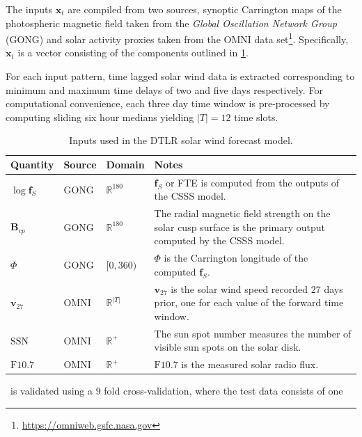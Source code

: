 The inputs $\mathbf{x}_t$ are compiled from two sources, synoptic Carrington maps of the photospheric 
magnetic field taken from the \emph{Global Oscillation Network Group} (GONG) and solar activity 
proxies taken from the OMNI data set\footnote{\url{https://omniweb.gsfc.nasa.gov}}. Specifically, 
$\mathbf{x}_t$ is a vector consisting of the components outlined in \cref{table:dtlrInputs}.

For each input pattern, time lagged solar wind data is extracted corresponding to minimum and 
maximum time delays of two and five days respectively. For computational convenience, each three 
day time window is pre-processed by computing sliding six hour medians yielding $|T| = 12$ time 
slots.
%
\begin{table}[ht]
    \centering
    \begin{tabular}{l l l p{}}
        \hline
        \textbf{Quantity} & \textbf{Source} & \textbf{Domain} & \textbf{Notes}\\
        \hline
        \vspace{5pt}
          $\log \mathbf{f}_S$ & 
          GONG & 
          $\mathbb{R}^{180}$ & 
          $\mathbf{f}_S$ or FTE is computed from the outputs of the CSSS model.\\
          $\mathbf{B}_{cp}$ & 
          GONG & 
          $\mathbb{R}^{180}$  & 
          The radial magnetic field strength on the solar cusp surface is the primary output computed by the CSSS model.\\
          $\Phi$ & 
          GONG & 
          $[0, 360)$ & 
          $\Phi$ is the Carrington longitude of the computed $\mathbf{f}_S$.\\
          $\mathbf{v}_{27}$ & 
          OMNI & 
          $\mathbb{R}^{\rvert T \rvert}$ & 
          $\mathbf{v}_{27}$ is the solar wind speed recorded $27$ days prior, one for each value of the forward time window. \\
          $\mathrm{SSN}$ & OMNI & $\mathbb{R}^{+}$ & The sun spot number measures the number of visible sun spots on the solar disk. \\
          $\mathrm{F}10.7$ & OMNI & $\mathbb{R}^{+}$ & $\mathrm{F}10.7$ is the measured solar radio flux. \\
        \hline
    \end{tabular}
    \caption{Inputs used in the DTLR solar wind forecast model.}
    \label{table:dtlrInputs}
\end{table}
%
\XX\ is validated using a $9$ fold cross-validation, where the test data consists of one 
